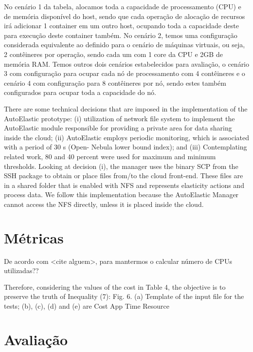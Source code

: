 \documentclass[twoside,english,brazilian]{UNISINOSartigo}
\begin{document}
\begin{itemize}
No cenário 1 da tabela, alocamos toda a capacidade de processamento (CPU) e de memória disponível do host, sendo que cada operação de alocação de recursos irá adicionar 1 container em um outro host, ocupando toda a capacidade deste para execução deste container também. No cenário 2, temos uma configuração considerada equivalente ao definido para o cenário de máquinas virtuais, ou seja, 2 contêineres por operação, sendo cada um com 1 core da CPU e 2GB de memória RAM. Temos outros dois cenários estabelecidos para avaliação, o cenário 3 com configuração para ocupar cada nó de processamento com 4 contêineres e o cenário 4 com configuração para 8 contêineres por nó, sendo estes também configurados para ocupar toda a capacidade do nó.





There are some technical decisions that are imposed in
the implementation of the AutoElastic prototype: (i) utilization
of network file system to implement the AutoElastic
module responsible for providing a private area for data
sharing inside the cloud; (ii) AutoElastic employs periodic
monitoring, which is associated with a period of 30 s (Open-
Nebula lower bound index); and (iii) Contemplating related
work, 80 and 40 percent were used for maximum and minimum
thresholds. Looking at decision (i), the manager uses
the binary SCP from the SSH package to obtain or place files
from/to the cloud front-end. These files are in a shared
folder that is enabled with NFS and represents elasticity
actions and process data. We follow this implementation
because the AutoElastic Manager cannot access the NFS
directly, unless it is placed inside the cloud.

\section{Métricas}
\label{metricas}

De acordo com <cite alguem>, para mantermos o 
calcular número de CPUs utilizadas??


Therefore, considering the values of the cost in
Table 4, the objective is to preserve the truth of
Inequality (7):
Fig. 6. (a) Template of the input file for the tests; (b), (c), (d) and (e) are Cost App Time Resource

\section{Avaliação}
\label{avaliacao}


\end{itemize}
\end{document}
